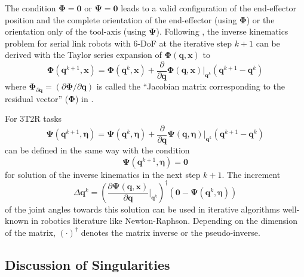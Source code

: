 \documentclass[twocolumn,10pt]{IFTOMM}
\newcommand{\bm}[1]{\boldsymbol{#1}}
\begin{document}
The condition $\bm{\Phi}=\bm{0}$ or $\bm{\Psi}=\bm{0}$ leads to a valid configuration of the end-effector position and the complete orientation of the end-effector (using $\bm{\Phi}$) or the orientation only of the tool-axis (using $\bm{\Psi}$).
Following \cite{GoldenbergBenFen1985}, the inverse kinematics problem for serial link robots with 6-DoF at the iterative step $k+1$ can be derived with the Taylor series expansion of $\bm{\Phi}(\bm{q},\bm{x})$ to
%
\begin{equation}
\bm{\Phi}(\bm{q}^{k+1},\bm{x}) = 
\bm{\Phi}(\bm{q}^{k},\bm{x})
+
\frac{\partial}{\partial \bm{q}} \bm{\Phi}(\bm{q},\bm{x}) \biggr\rvert_{\bm{q}^k} (\bm{q}^{k+1} - \bm{q}^k)
\label{equ:taylor_phi}
\end{equation}
%
where $\bm{\Phi}_{\partial\bm{q}}=(\partial \bm{\Phi} / \partial \bm{q})$ is called the ``Jacobian matrix corresponding to the residual vector'' ($\bm{\Phi}$) in \cite{GoldenbergBenFen1985}.

For 3T2R tasks
%
\begin{equation}
\bm{\Psi}(\bm{q}^{k+1},\bm{\eta}) = 
\bm{\Psi}(\bm{q}^{k},\bm{\eta})
+
\frac{\partial}{\partial \bm{q}} \bm{\Psi}(\bm{q},\bm{\eta}) \biggr\rvert_{\bm{q}^k} (\bm{q}^{k+1} - \bm{q}^k)
\label{equ:taylor_psi}
\end{equation}
%
can be defined in the same way with the condition
%
\begin{equation}
\bm{\Psi}(\bm{q}^{k+1},\bm{\eta})=\bm{0}
\end{equation}
%
for solution of the inverse kinematics in the next step $k+1$. The increment 
%
\begin{equation}
\Delta \bm{q}^k
=
\left(\frac{\partial \bm{\Psi}(\bm{q},\bm{x})}{\partial \bm{q}}\biggr\rvert_{\bm{q}^k}\right)^{\dagger}
(\bm{0} - \bm{\Psi}(\bm{q}^{k},\bm{\eta}))
\label{equ:deltaq_psi}
\end{equation}
%
of the joint angles towards this solution can be used in iterative algorithms well-known in robotics literature like Newton-Raphson.
Depending on the dimension of the matrix, $(\cdot)^\dagger$ denotes the matrix inverse or the pseudo-inverse.

\subsection{Discussion of Singularities}
\end{document}
